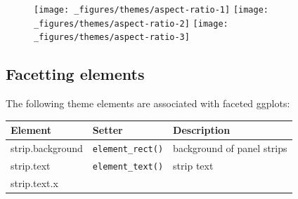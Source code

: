 \begin{figure}[H]
  \texttt{[image: \_figures/themes/aspect-ratio-1]}%
  \texttt{[image: \_figures/themes/aspect-ratio-2]}%
  \texttt{[image: \_figures/themes/aspect-ratio-3]}
\end{figure}

\subsection{Facetting elements}\label{facetting-elements}

 

The following theme elements are associated with faceted ggplots:

\begin{longtable}[c]{@{}lll@{}}
\toprule
\begin{minipage}[b]{0.27\columnwidth}\raggedright\strut
Element
\strut\end{minipage} &
\begin{minipage}[b]{0.24\columnwidth}\raggedright\strut
Setter
\strut\end{minipage} &
\begin{minipage}[b]{0.47\columnwidth}\raggedright\strut
Description
\strut\end{minipage}\tabularnewline
\midrule
\endhead
\begin{minipage}[t]{0.27\columnwidth}\raggedright\strut
strip.background
\strut\end{minipage} &
\begin{minipage}[t]{0.24\columnwidth}\raggedright\strut
\texttt{element\_rect()}
\strut\end{minipage} &
\begin{minipage}[t]{0.47\columnwidth}\raggedright\strut
background of panel strips
\strut\end{minipage}\tabularnewline
\begin{minipage}[t]{0.27\columnwidth}\raggedright\strut
strip.text
\strut\end{minipage} &
\begin{minipage}[t]{0.24\columnwidth}\raggedright\strut
\texttt{element\_text()}
\strut\end{minipage} &
\begin{minipage}[t]{0.47\columnwidth}\raggedright\strut
strip text
\strut\end{minipage}\tabularnewline
\begin{minipage}[t]{0.27\columnwidth}\raggedright\strut
strip.text.x
\strut\end{minipage} &

\end{longtable}
